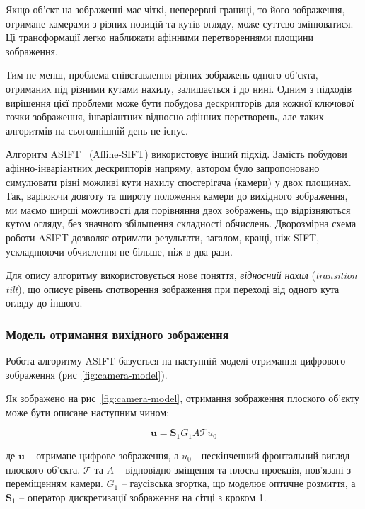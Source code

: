Якщо об'єкт на зображенні має чіткі, неперервні границі, то його зображення, отримане камерами з різних позицій та кутів огляду, може суттєво змінюватися. Ці трансформації легко наближати афінними перетвореннями площини зображення.

Тим не менш, проблема співставлення різних зображень одного об'єкта, отриманих під різними кутами нахилу, залишається і до нині. Одним з підходів вирішення цієї проблеми може бути побудова дескрипторів для кожної ключової точки зображення, інваріантних відносно афінних перетворень, але таких алгоритмів на сьогоднішній день не існує. 

Алгоритм ASIFT~\cite{Morel2009} (Affine-SIFT) використовує інший підхід. Замість побудови афінно-інваріантних дескрипторів напряму, автором було запропоновано симулювати різні можливі кути нахилу спостерігача (камери) у двох площинах. Так, варіюючи довготу та широту положення камери до вихідного зображення, ми маємо ширші можливості для порівняння двох зображень, що відрізняються кутом огляду, без значного збільшення складності обчислень. Дворозмірна схема роботи ASIFT дозволяє отримати результати, загалом, кращі, ніж SIFT, ускладнюючи обчислення не більше, ніж в два рази. 

Для опису алгоритму використовується нове поняття, \textit{відносний нахил} (\textit{transition tilt}), що описує рівень спотворення зображення при переході від одного кута огляду до іншого. 

\subsubsection{Модель отримання вихідного зображення}
Робота алгоритму ASIFT базується на наступній моделі отримання цифрового зображення (рис~\ref{fig:camera-model}).


Як зображено на рис~\ref{fig:camera-model}, отримання зображення плоского об'єкту може бути описане наступним чином:

\begin{equation}
  \textbf{u}=\textbf{S}_1G_1A\mathcal{T}u_0
\end{equation}

де $\textbf{u}$ -- отримане цифрове зображення, а $u_0$ - нескінченний фронтальний вигляд плоского об'єкта. $\mathcal{T}$ та $A$ -- відповідно зміщення та плоска проекція, пов'язані з переміщенням камери. $G_1$ -- гаусівська згортка, що моделює оптичне розмиття, а $\textbf{S}_1$ -- оператор дискретизації зображення на сітці з кроком 1. 

